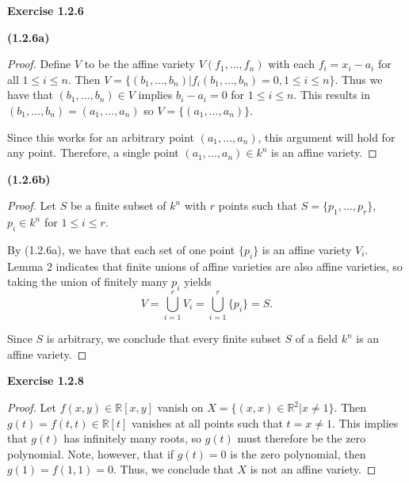 \documentclass[12pt,oneside]{article}
\newenvironment{exercise}[1]{\vspace{.1in}\noindent\textbf{Exercise #1 \hspace{.05em}}}{}
\newcommand{\R}{\mathbb{R}}
\begin{document}
\begin{exercise}{1.2.6}

    \bigskip
    \textbf{(1.2.6a)}
    \begin{proof}
        Define $V$ to be the affine variety $V(f_1,\ldots,f_n)$ with each $f_i = x_i - a_i$ for
        all $1 \leq i \leq n$. Then $V = \{(b_1, \ldots, b_n) | f_i(b_1,\ldots, b_n) = 0, 1\leq i \leq n\}$. Thus we have that $(b_1,\ldots, b_n) \in V$ implies $b_i - a_i = 0$ for $1 \leq i \leq n$. This results in $(b_1, \ldots, b_n) = (a_1, \ldots, a_n)$ so $V = \{(a_1, \ldots, a_n)\}$. 

        Since this works for an arbitrary point $(a_1, \ldots, a_n)$, this argument will 
        hold for any point. Therefore, a single point $(a_1, \ldots, a_n) \in k^n$ is an affine
        variety.
    \end{proof}

    \bigskip
    \textbf{(1.2.6b)}
    \begin{proof}
        Let $S$ be a finite subset of $k^n$ with $r$ points such that $S = \{p_1, \ldots, p_r\}$, $p_i \in k^n$ for $1 \leq i \leq r$. 

        By (1.2.6a), we have that each set of one point $\{p_i\}$ is an affine variety $V_i$. 
        Lemma 2 indicates that finite unions of affine varieties are also affine varieties, so
        taking the union of finitely many $p_i$ yields
        \[
            V = \bigcup_{i=1}^r V_i = \bigcup_{i=1}^r \{p_i\} = S.
        \]

        Since $S$ is arbitrary, we conclude that every finite subset $S$ of a field $k^n$ is an
        affine variety.
    \end{proof}
\end{exercise}

\newpage
\begin{exercise}{1.2.8}
    \begin{proof}
        Let $f(x,y) \in \R[x,y]$ vanish on $X = \{(x,x) \in \R^2 | x \neq 1\}$. Then 
        $g(t) = f(t,t) \in \R[t]$ vanishes at all points such that $t = x \neq 1$. This 
        implies that $g(t)$ has infinitely many roots, so $g(t)$ must therefore be the 
        zero polynomial. Note, however, that if $g(t) = 0$ is the zero polynomial, then 
        $g(1) = f(1,1) = 0$. Thus, we conclude that $X$ is not an affine variety.
    \end{proof}
\end{exercise}
\end{document}

